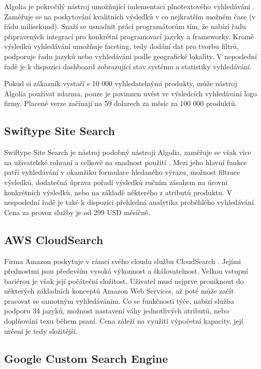 \documentclass[FM,DP]{tulthesis}
\begin{document}
Algolia je pokročilý nástroj umožňující imlementaci plnotextového vyhledávání \cite{algolia}. 
Zaměřuje se na poskytování kvalitních výsledků v co nejkratším možném čase (v řádu milisekund). 
Snaží se usnadnit práci programátorům tím, že nabízí řadu připravených integrací 
pro konkrétní programovací jazyky a frameworky. Kromě výsledků vyhledávání umožňuje 
faceting, tedy dodání dat pro tvorbu filtrů, podporuje řadu jazyků nebo vyhledávání 
podle geografické lokality. V neposlední řadě je k dispozici dashboard zobrazující 
stav systému a statistiky vyhledávání.

Pokud si zákazník vystačí s 10 000 vyhledatelnými produkty, může nástroj Algolia používat
zdarma, pouze je povinnen uvést ve výsledcích vyhledávání logo firmy. Placené verze 
začínají na 59 dolarech za měsíc za 100 000 produktů.

\subsection{Swiftype Site Search}

Swiftype Site Search je nástroj podobný nástroji Algolia, zaměřuje se však více na 
uživatelské rohraní a celkově na snadnost použití \cite{swiftype}. Mezi jeho hlavní
funkce patří vyhledávání v okamžiku formulace hledaného výrazu, možnost filtrace
výsledků, dodatečná úprava pořadí výsledků ručním zásahem na úrovni konkrétních 
výsledků, nebo na základě některého z atributů produktu. V nesposlední řadě je také
k dispozici přehledná analytika proběhlého vyhledávání. Cena za provoz služby
je od 299 USD měsíčně.

\subsection{AWS CloudSearch}

Firma Amazon poskytuje v rámci svého cloudu službu CloudSearch \cite{cloud-search}.
Jejími přednostmi jsou především vysoká výkonnost a škálovatelnost. Velkou vstupní
bariérou je však její počáteční složitost. Uživatel musí nejprve proniknout do 
některých základních konceptů Amazon Web Services, až poté může začít pracovat
se samotným vyhledáváním. Co se funkčnosti týče, nabízí služba podporu 34 jazyků, 
možnost nastavení váhy jednotlivých atributů, nebo doplňování texu během psaní.
Cena záleží na využití výpočetní kapacity, její určení je tedy složitější.

\subsection{Google Custom Search Engine}
\end{document}
